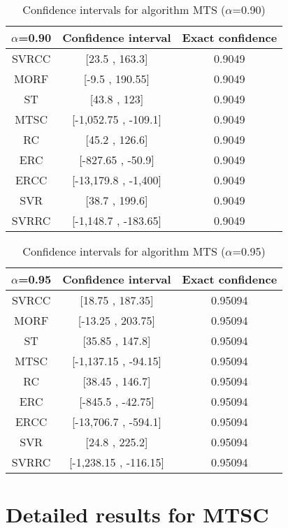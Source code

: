 \documentclass[a4paper,10pt]{article}
\begin{document}
\begin{table}[!htp]
\centering\small
\begin{tabular}{
|c|c|c|}
\hline
 $\alpha$=0.90 & Confidence interval & Exact confidence \\ \hline 
SVRCC & [23.5 , 163.3] & 0.9049\\ \hline 
MORF & [-9.5 , 190.55] & 0.9049\\ \hline 
ST & [43.8 , 123] & 0.9049\\ \hline 
MTSC & [-1,052.75 , -109.1] & 0.9049\\ \hline 
RC & [45.2 , 126.6] & 0.9049\\ \hline 
ERC & [-827.65 , -50.9] & 0.9049\\ \hline 
ERCC & [-13,179.8 , -1,400] & 0.9049\\ \hline 
SVR & [38.7 , 199.6] & 0.9049\\ \hline 
SVRRC & [-1,148.7 , -183.65] & 0.9049\\ \hline 

\end{tabular}
\caption{Confidence intervals for algorithm MTS ($\alpha$=0.90)}
\end{table}
\begin{table}[!htp]
\centering\small
\begin{tabular}{
|c|c|c|}
\hline
 $\alpha$=0.95 & Confidence interval & Exact confidence \\ \hline 
SVRCC & [18.75 , 187.35] & 0.95094\\ \hline 
MORF & [-13.25 , 203.75] & 0.95094\\ \hline 
ST & [35.85 , 147.8] & 0.95094\\ \hline 
MTSC & [-1,137.15 , -94.15] & 0.95094\\ \hline 
RC & [38.45 , 146.7] & 0.95094\\ \hline 
ERC & [-845.5 , -42.75] & 0.95094\\ \hline 
ERCC & [-13,706.7 , -594.1] & 0.95094\\ \hline 
SVR & [24.8 , 225.2] & 0.95094\\ \hline 
SVRRC & [-1,238.15 , -116.15] & 0.95094\\ \hline 

\end{tabular}
\caption{Confidence intervals for algorithm MTS ($\alpha$=0.95)}
\end{table}

 \clearpage 


\section{Detailed results for MTSC}
\end{document}
